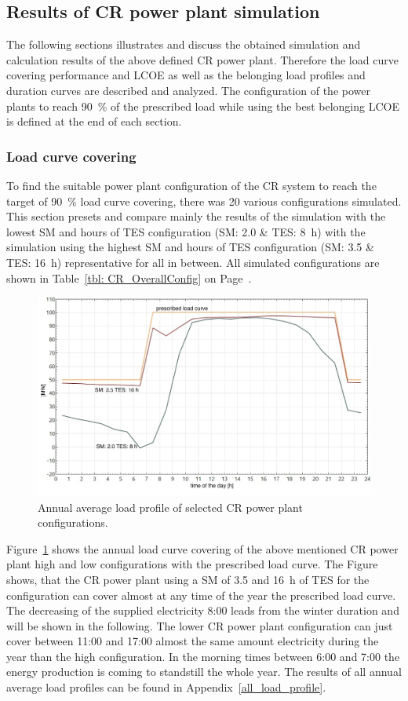 \subsection{Results of CR power plant simulation}
The following sections illustrates and discuss the obtained simulation and calculation results of the above defined CR power plant. Therefore the load curve covering performance and LCOE as well as the belonging load profiles and duration curves are described and analyzed. The configuration of the power plants to reach 90~\% of the prescribed load while using the best belonging LCOE is defined at the end of each section.
\subsubsection{Load curve covering}
To find the suitable power plant configuration of the CR system to reach the target of 90~\% load curve covering, there was 20 various configurations simulated. This section presets and compare mainly the results of the simulation with the lowest SM and hours of TES configuration (SM: 2.0 \& TES: \SI{8}{h}) with the simulation using the highest SM and hours of TES configuration (SM: 3.5 \& TES: \SI{16}{h}) representative for all in between. All simulated configurations are shown in Table~\ref{tbl: CR_OverallConfig} on Page~\pageref{tbl: CR_OverallConfig}.

\begin{figure}[htbp]  
\centering
\includegraphics[width=0.8\linewidth]{FIG/CR_annual_profil}
\caption[Annual average load profile of selected CR power plant configurations.]{Annual average load profile of selected CR power plant configurations.}\label{CR_annual_profil}
\end{figure}
Figure~\ref{CR_annual_profil} shows the annual load curve covering of the above mentioned CR power plant high and low configurations with the prescribed load curve. The Figure shows, that the CR power plant using a SM of 3.5 and \SI{16}{h} of TES for the configuration can cover almost at any time of the year the prescribed load curve. The decreasing of the supplied electricity 8:00 leads from the winter duration and will be shown in the following. The lower CR power plant configuration can just cover between 11:00 and 17:00 almost the same amount electricity during the year than the high configuration. In the morning times between 6:00 and 7:00 the energy production is coming to standstill the whole year. The results of all annual average load profiles can be found in Appendix~\ref{all_load_profile}.

